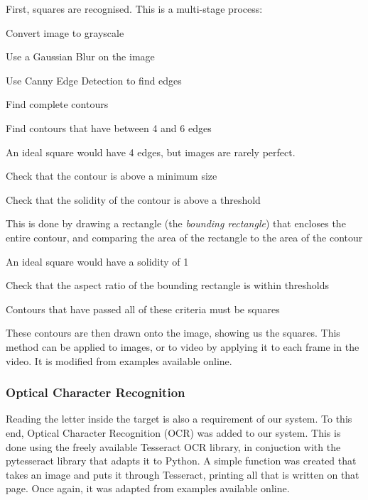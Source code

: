 \documentclass[11pt]{article}
\begin{document}
First, squares are recognised. This is a multi-stage process:
\begin{compactenum}
    \item Convert image to grayscale
    \item Use a Gaussian Blur on the image
    \item Use Canny Edge Detection to find edges
    \item Find complete contours
    \item Find contours that have between 4 and 6 edges
    \begin{compactitem}
        \item An ideal square would have 4 edges, but images are rarely perfect.
    \end{compactitem}
    \item Check that the contour is above a minimum size
    \item Check that the solidity of the contour is above a threshold
    \begin{compactitem}
        \item This is done by drawing a rectangle (the \emph{bounding rectangle}) that encloses the entire contour, and comparing the area of the rectangle to the area of the contour
        \item An ideal square would have a solidity of 1
    \end{compactitem}
    \item Check that the aspect ratio of the bounding rectangle is within thresholds
    \item Contours that have passed all of these criteria must be squares
\end{compactenum}
These contours are then drawn onto the image, showing us the squares. This method can be applied to images, or to video by applying it to each frame in the video. It is modified from examples available online.\cite{opencv_tutorials}\cite{pyimagesearch_squares}

\subsubsection{Optical Character Recognition}
Reading the letter inside the target is also a requirement of our system. To this end, Optical Character Recognition (OCR) was added to our system. This is done using the freely available Tesseract OCR library, in conjuction with the pytesseract library that adapts it to Python. A simple function was created that takes an image and puts it through Tesseract, printing all that is written on that page. Once again, it was adapted from examples available online.\cite{pyimagesearch_ocr}
\end{document}
